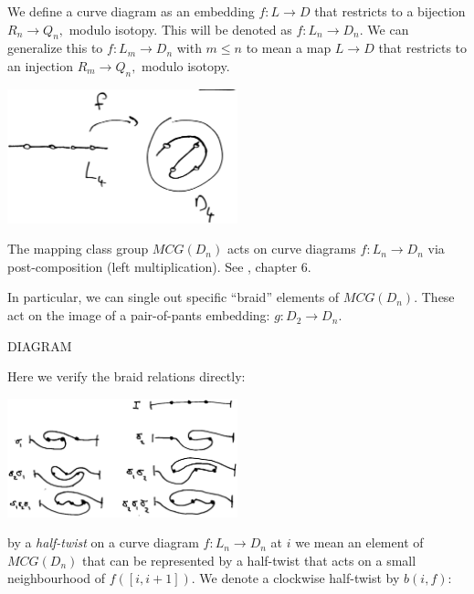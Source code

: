\documentclass[12pt,a4paper]{article}
\begin{document}
We define a curve diagram as an embedding $f : L\to D$ that
restricts to a bijection $R_n\to Q_n,$ modulo
isotopy.
This will be denoted as $f : L_n\to D_n.$
We can generalize this to $f : L_m\to D_n$ with $m\leq n$
to mean a map $L\to D$ that restricts to an injection $R_m\to Q_n,$
modulo isotopy.

\begin{center}
\includegraphics[width=0.5\textwidth]{curve-diagram.eps}
\end{center}




The mapping class group $MCG(D_n)$ acts on curve diagrams $f : L_n\to D_n$
via post-composition (left multiplication). See \cite{Dehornoy02}, chapter 6.


In particular, we can single out specific ``braid'' elements of $MCG(D_n)$.
These act on the image of a pair-of-pants embedding: $g:D_2\to D_n.$

DIAGRAM

Here we verify the braid relations directly:

\begin{center}
\includegraphics[width=0.5\textwidth]{curve-braid.eps}
\end{center}



 by a {\it half-twist} on a curve
diagram $f:L_n\to D_n$ at $i$ we mean an element of $MCG(D_n)$
that can be represented by a half-twist that acts
on a small neighbourhood of $f([i, i+1]).$
We denote a clockwise half-twist by $b(i, f):$
\end{document}
